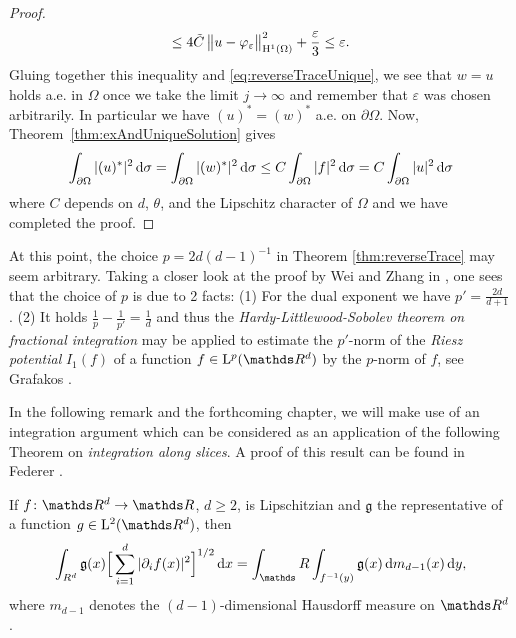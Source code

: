 \begin{proof}
\begin{align*}
    \leq 4 \tilde C \, \big\| u - \varphi_\varepsilon \big\|_{\mathrm{H}^1(\Omega)}^2 + \frac{\varepsilon}{3} 
    \leq \varepsilon.
  \end{align*}
  Gluing together this inequality and \eqref{eq:reverseTraceUnique}, we see that $w = u$ holds a.e. in $\Omega$ once we take the limit $j \to \infty$ and remember that $\varepsilon$ was chosen arbitrarily.
  In particular we have $(u)^* = (w)^*$ a.e. on $\partial\Omega$.
  Now, Theorem~\ref{thm:exAndUniqueSolution} gives
  \begin{align*}
    \int_{\partial\Omega} |(u)^*|^2 \, {\operatorname{d}\!{\sigma}} 
    = \int_{\partial\Omega} |(w)^*|^2 \, {\operatorname{d}\!{\sigma}}
    \leq C \int_{\partial\Omega} |f|^2 \, {\operatorname{d}\!{\sigma}} 
    = C \int_{\partial\Omega} |u|^2 \, {\operatorname{d}\!{\sigma}}
  \end{align*}
  where $C$ depends on $d$, $\theta$, and the Lipschitz character of $\Omega$ and we have completed the proof.
\end{proof}

\begin{rem}
  At this point, the choice $p = {2d}({d - 1})^{-1}$ in Theorem \ref{thm:reverseTrace} may seem arbitrary.
  Taking a closer look at the proof by Wei and Zhang in \cite[Lem. 3.3]{weiZhang}, one sees that the choice of $p$ is due to 2 facts: (1) For the dual exponent we have $p' = \frac{2d}{d + 1}$. (2) It holds $\frac{1}{p} - \frac{1}{p'} = \frac{1}{d}$ and thus the \emph{Hardy-Littlewood-Sobolev theorem on fractional integration} may be applied to estimate the $p'$-norm of the \emph{Riesz potential} $I_1(f)$ of a function $f \in \Ell^p(\R^d)$ by the $p$-norm of $f$, see Grafakos \cite[Thm 6.1.3]{grafakos2009modern}.
\end{rem}

In the following remark and the forthcoming chapter, we will make use of an integration argument which can be considered as an application of the following Theorem on \emph{integration along slices}. A proof of this result can be found in Federer \cite[Thm. 3.2.12]{federer}.

\begin{thm}
  \label{thm:coarea}
  If $f \colon \R^d \to \R$, $d \geq 2$, is Lipschitzian and $\mathfrak{g}$ the representative of a function $g \in \Ell^2(\R^d)$, then
  \begin{align}
    \label{eq:coarea}
    \int_{R^d} \mathfrak{g}(x) \Big[ \sum_{i = 1}^d |\partial_i f(x)|^2 \Big]^{1/2} \d x = \int_\R \int_{f^{-1}(y)} \mathfrak{g}(x) \d m_{d - 1}(x) \d y,
  \end{align}
  where $m_{d - 1}$ denotes the $(d - 1)$-dimensional Hausdorff measure on $\R^d$.
\end{thm}


